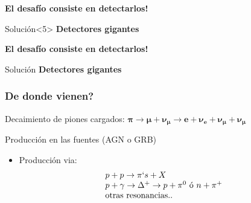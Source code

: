 \begin{frame}
\begin{textblock}{7}
\begin{overprint}
		\vspace*{1cm}
		\begin{block}{}
		\centering 
		\textbf{El desaf\'io consiste en detectarlos!}
		\end{block}
		\vfill
		\begin{alertblock}{Soluci\'on}<5>
		\centering 
		\textbf{Detectores gigantes}
		\end{alertblock}
		\vfill
	\onslide<5>
		\vspace*{1cm}
		\begin{block}{}
		\centering 
		\textbf{El desaf\'io consiste en detectarlos!}
		\end{block}
		\begin{alertblock}{Soluci\'on}
		\centering 
		\textbf{Detectores gigantes}
		\end{alertblock}
   \end{overprint}
 \end{textblock}
\end{frame}

\begin{frame}
 \frametitle{De donde vienen?}
 \begin{alertblock}{}
  \centering
  Decaimiento de piones cargados: $\bm{\pi\rightarrow\mu+\nu_\mu\rightarrow e + \nu_e + \nu_\mu + \nu_\mu}$
 \end{alertblock}

 \begin{block}{Producci\'on en las fuentes (AGN o GRB)}
  \begin{itemize}
   \item Producci\'on via:
   \begin{displaymath}
    \begin{array}{l}
		p + p \rightarrow \pi`s + X \\
		p + \gamma \rightarrow \Delta^{+} \rightarrow p +\pi^{0}\,\,{\rm \acute{o}}\,\, n +\pi^{+} \\
        {\rm otras\,\, resonancias..}
	\end{array}
   \end{displaymath}
  \end{itemize}
 \end{block}
 \vfill
 \begin{center}
 \end{center}
 \vfill
\end{frame}

